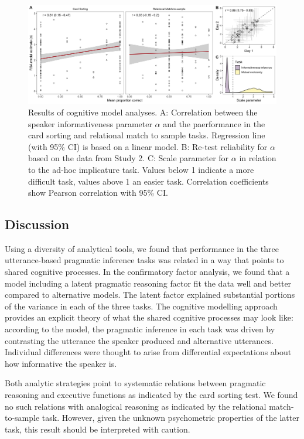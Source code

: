 \documentclass[
  man,floatsintext]{apa6}
\begin{document}
\begin{figure}

{\centering \includegraphics[width=1\linewidth]{./figures/figure6} 

}

\caption{Results of cognitive model analyses. A: Correlation between the speaker informativeness parameter \(\alpha\) and the paerformance in the card sorting and relational match to sample tasks. Regression line (with 95\% CI) is based on a linear model. B: Re-test reliability for \(\alpha\) based on the data from Study 2. C: Scale parameter for \(\alpha\) in relation to the ad-hoc implicature task. Values below 1 indicate a more difficult task, values above 1 an easier task. Correlation coefficients show Pearson correlation with 95\% CI.}\label{fig:fig6}
\end{figure}

\hypertarget{discussion-2}{%
\subsection{Discussion}\label{discussion-2}}

Using a diversity of analytical tools, we found that performance in the three utterance-based pragmatic inference tasks was related in a way that points to shared cognitive processes. In the confirmatory factor analysis, we found that a model including a latent pragmatic reasoning factor fit the data well and better compared to alternative models. The latent factor explained substantial portions of the variance in each of the three tasks. The cognitive modelling approach provides an explicit theory of what the shared cognitive processes may look like: according to the model, the pragmatic inference in each task was driven by contrasting the utterance the speaker produced and alternative utterances. Individual differences were thought to arise from differential expectations about how informative the speaker is.

Both analytic strategies point to systematic relations between pragmatic reasoning and executive functions as indicated by the card sorting test. We found no such relations with analogical reasoning as indicated by the relational match-to-sample task. However, given the unknown psychometric properties of the latter task, this result should be interpreted with caution.
\end{document}
